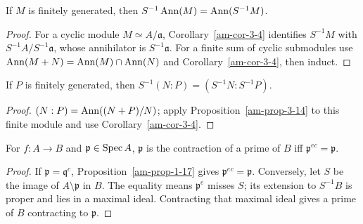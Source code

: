 \begin{proposition}
\label{am-prop-3-14}
\uses{}
If $M$ is finitely generated, then
$S^{-1}\operatorname{Ann}(M)=\operatorname{Ann}(S^{-1}M)$.
\end{proposition}
\begin{proof}
For a cyclic module $M\simeq A/\mathfrak{a}$, Corollary~\ref{am-cor-3-4} identifies
$S^{-1}M$ with $S^{-1}A/S^{-1}\mathfrak{a}$, whose annihilator is $S^{-1}\mathfrak{a}$.
For a finite sum of cyclic submodules use
$\operatorname{Ann}(M+N)=\operatorname{Ann}(M)\cap\operatorname{Ann}(N)$ and Corollary~\ref{am-cor-3-4}, then induct.
\end{proof}
\begin{corollary}
\label{am-cor-3-15}
\uses{}
If $P$ is finitely generated, then
$S^{-1}(N:P)=(S^{-1}N:S^{-1}P)$.
\end{corollary}
\begin{proof}
$(N:P)=\operatorname{Ann}((N+P)/N)$; apply Proposition~\ref{am-prop-3-14} to this finite
module and use Corollary~\ref{am-cor-3-4}.
\end{proof}
\begin{proposition}
\label{am-prop-3-16}
\uses{}
For $f:A\to B$ and $\mathfrak{p}\in\operatorname{Spec} A$, $\mathfrak{p}$ is the contraction of a prime of
$B$ iff $\mathfrak{p}^{ec}=\mathfrak{p}$.
\end{proposition}
\begin{proof}
If $\mathfrak{p}=\mathfrak{q}^c$, Proposition~\ref{am-prop-1-17} gives $\mathfrak{p}^{ec}=\mathfrak{p}$.  Conversely,
let $S$ be the image of $A\setminus\mathfrak{p}$ in $B$.  The equality means
$\mathfrak{p}^e$ misses $S$; its extension to $S^{-1}B$ is proper and lies in a maximal
ideal.  Contracting that maximal ideal gives a prime of $B$ contracting to
$\mathfrak{p}$.
\end{proof}
